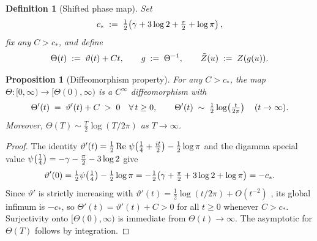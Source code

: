 \documentclass{amsart}
\newcommand{\assign}{:=}
\newcommand{\tmop}[1]{\ensuremath{\operatorname{#1}}}
\newtheorem{definition}{Definition}
\newtheorem{proposition}{Proposition}
{\theoremstyle{remark}\newtheorem{remark}{Remark}}
\newcommand{\Rea}{\tmop{Re}}
\newcommand{\Zt}{\tilde{Z}}
\begin{document}
\begin{definition}
  [Shifted phase map]\label{def:Theta} Set
  \[ c_{\ast} \hspace{0.27em} \assign \hspace{0.27em} \tfrac{1}{2}
     \hspace{-0.17em} \left( \gamma + 3 \log 2 + \tfrac{\pi}{2} + \log \pi
     \right), \]
  fix any $C > c_{\ast}$, and define
  \[ \Theta (t) \hspace{0.27em} \assign \hspace{0.27em} \vartheta (t) + Ct,
     \qquad g \hspace{0.27em} \assign \hspace{0.27em} \Theta^{- 1}, \qquad \Zt
     (u) \hspace{0.27em} \assign \hspace{0.27em} Z (g (u)) . \]
\end{definition}

\begin{proposition}
  [Diffeomorphism property]\label{prop:diffeo} For any $C > c_{\ast}$, the map
  $\Theta : [0, \infty) \to [\Theta (0), \infty)$ is a $C^{\infty}$
  diffeomorphism with
  \[ \Theta' (t) \hspace{0.27em} = \hspace{0.27em} \vartheta' (t) + C
     \hspace{0.27em} > \hspace{0.27em} 0 \quad \forall \hspace{0.17em} t \ge
     0, \qquad \Theta' (t) \hspace{0.27em} \sim \hspace{0.27em} \tfrac{1}{2}
     \log \hspace{-0.17em} \left( \tfrac{t}{2 \pi} \right)  \quad (t \to
     \infty) . \]
  Moreover, $\Theta (T) \sim \tfrac{T}{2} \log (T / 2 \pi)$ as $T \to \infty$.
\end{proposition}

\begin{proof}
  The identity $\vartheta' (t) = \tfrac{1}{2} \Rea \hspace{0.17em} \psi
  \hspace{-0.17em} \left( \tfrac{1}{4} + \tfrac{it}{2} \right) - \tfrac{1}{2}
  \log \pi$ and the digamma special value $\psi \hspace{-0.17em} \left(
  \tfrac{1}{4} \right) = - \gamma - \tfrac{\pi}{2} - 3 \log 2$ give
  \[ \vartheta' (0) = \tfrac{1}{2} \psi \hspace{-0.17em} \left( \tfrac{1}{4}
     \right) - \tfrac{1}{2} \log \pi = - \tfrac{1}{2} \hspace{-0.17em} \left(
     \gamma + \tfrac{\pi}{2} + 3 \log 2 + \log \pi \right) = - c_{\ast} . \]
  Since $\vartheta'$ is strictly increasing with $\vartheta' (t) =
  \tfrac{1}{2} \log (t / 2 \pi) + O (t^{- 2})$ {\cite{Titchmarsh1986}}, its
  global infimum is $- c_{\ast}$, so $\Theta' (t) = \vartheta' (t) + C > 0$
  for all $t \ge 0$ whenever $C > c_{\ast}$. Surjectivity onto $[\Theta (0),
  \infty)$ is immediate from $\Theta (t) \to \infty$. The asymptotic for
  $\Theta (T)$ follows by integration.
\end{proof}
\end{document}
